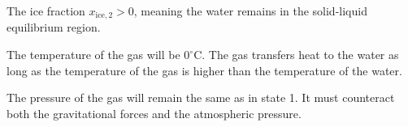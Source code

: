 The ice fraction \( x_{\text{ice},2} > 0 \), meaning the water remains in the solid-liquid equilibrium region.  

The temperature of the gas will be \( 0^\circ\text{C} \). The gas transfers heat to the water as long as the temperature of the gas is higher than the temperature of the water.  

The pressure of the gas will remain the same as in state 1. It must counteract both the gravitational forces and the atmospheric pressure.